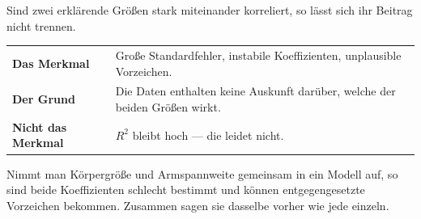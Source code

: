 \begin{warnung}
Sind zwei erklärende Größen stark miteinander korreliert, so lässt sich ihr Beitrag nicht trennen.

\begin{center}
\renewcommand{\arraystretch}{1.5}
\begin{tabular}{@{}P{2.6cm}P{6.0cm}@{}}
\toprule
\textbf{Das Merkmal} & Große Standardfehler, instabile Koeffizienten, unplausible Vorzeichen.\\
\textbf{Der Grund} & Die Daten enthalten keine Auskunft darüber, welche der beiden Größen wirkt.\\
\textbf{Nicht das Merkmal} & $R^2$ bleibt hoch --- die  leidet nicht.\\
\bottomrule
\end{tabular}
\end{center}

Nimmt man Körpergröße und Armspannweite gemeinsam in ein Modell auf, so sind beide Koeffizienten schlecht bestimmt und können entgegengesetzte Vorzeichen bekommen. Zusammen sagen sie dasselbe vorher wie jede einzeln.

\begin{center}
\begin{minipage}{0.88\textwidth}
\end{minipage}
\end{center}
\end{warnung}

